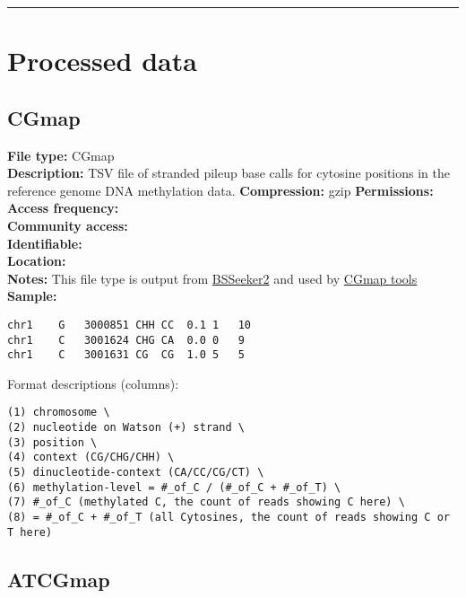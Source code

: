 \documentclass[
  11pt,
]{book}
\begin{document}
\begin{center}\rule{0.5\linewidth}{0.5pt}\end{center}

\hypertarget{processed-data}{%
\section{Processed data}\label{processed-data}}

\hypertarget{cgmap}{%
\subsection{CGmap}\label{cgmap}}

\textbf{File type:} CGmap\\
\textbf{Description:} TSV file of stranded pileup base calls for cytosine positions in the reference genome DNA methylation data.
\textbf{Compression:} gzip
\textbf{Permissions:}\\
\textbf{Access frequency:}\\
\textbf{Community access:}\\
\textbf{Identifiable:}\\
\textbf{Location:}\\
\textbf{Notes:} This file type is output from \href{https://github.com/BSSeeker/BSseeker2}{BSSeeker2} and used by \href{https://cgmaptools.github.io/}{CGmap tools}\\
\textbf{Sample:}

\begin{verbatim}
chr1    G   3000851 CHH CC  0.1 1   10
chr1    C   3001624 CHG CA  0.0 0   9
chr1    C   3001631 CG  CG  1.0 5   5
\end{verbatim}

Format descriptions (columns):

\begin{verbatim}
(1) chromosome \
(2) nucleotide on Watson (+) strand \
(3) position \
(4) context (CG/CHG/CHH) \
(5) dinucleotide-context (CA/CC/CG/CT) \
(6) methylation-level = #_of_C / (#_of_C + #_of_T) \
(7) #_of_C (methylated C, the count of reads showing C here) \
(8) = #_of_C + #_of_T (all Cytosines, the count of reads showing C or T here)
\end{verbatim}

\hypertarget{atcgmap}{%
\subsection{ATCGmap}\label{atcgmap}}
\end{document}
